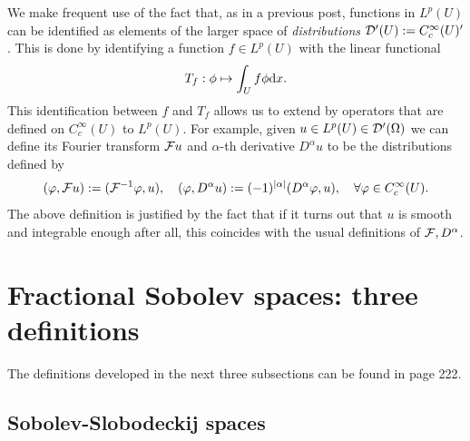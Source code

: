 \documentclass[
    a4paper,
    DIV=14,
    abstract=true,
    numbers=noenddot
]{scrartcl}
\begin{document}
We make frequent use of the fact that, as  in a previous post, functions in $L^p(U)$ can be identified as elements of the larger space of \emph{distributions} $\mathcal{D} '(U ):= C_c^\infty(U)'$. This is done by identifying a function $f \in L^p(U)$ with the linear functional 
\begin{align*}
    T_f:\phi \mapsto \int_U f\phi \mathrm{d} x.
\end{align*}
This identification between $f$ and $T_f$  allows us to extend by  operators that are defined on $C_c^\infty(U)$ to $L^p(U)$. For example, given $u \in L^p(U) \in \mathcal{D}'(\Omega )$ we can define its Fourier transform $\mathcal{F} u$  and  $\alpha$-th derivative $D^\alpha u$  to be the distributions defined by
\begin{align*}
    (\varphi ,\mathcal{F} u):=(\mathcal{F}^{-1}\varphi ,u),\quad (\varphi ,D^\alpha u):=(-1)^{{\left| \alpha \right|}}(D^\alpha \varphi ,u), \quad \forall \varphi \in C_c^\infty(U).
\end{align*}
The above definition is justified by the fact that if it turns out that $u$ is smooth and integrable enough after all, this coincides with the usual definitions of $\mathcal{F}, D^\alpha$.



\section{Fractional Sobolev spaces: three definitions}
The definitions developed in the next three subsections can be found in \cite{agranovich2015sobolev} page 222.
\subsection{Sobolev-Slobodeckij spaces}
\end{document}

